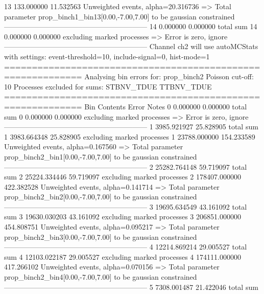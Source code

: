 13         133.000000      11.532563       Unweighted events, alpha=20.316736
  => Total parameter prop_binch1_bin13[0.00,-7.00,7.00] to be gaussian constrained
------------------------------------------------------------
14         0.000000        0.000000        total sum                     
14         0.000000        0.000000        excluding marked processes    
  => Error is zero, ignore      
------------------------------------------------------------
Channel ch2 will use autoMCStats with settings: event-threshold=10, include-signal=0, hist-mode=1
============================================================
Analysing bin errors for: prop_binch2
Poisson cut-off: 10
Processes excluded for sums: STBNV_TDUE TTBNV_TDUE
============================================================
Bin        Contents        Error           Notes                         
0          0.000000        0.000000        total sum                     
0          0.000000        0.000000        excluding marked processes    
  => Error is zero, ignore      
------------------------------------------------------------
1          3985.921927     25.828905       total sum                     
1          3983.664348     25.828905       excluding marked processes    
1          23788.000000    154.233589      Unweighted events, alpha=0.167560
  => Total parameter prop_binch2_bin1[0.00,-7.00,7.00] to be gaussian constrained
------------------------------------------------------------
2          25282.764148    59.719097       total sum                     
2          25224.334446    59.719097       excluding marked processes    
2          178407.000000   422.382528      Unweighted events, alpha=0.141714
  => Total parameter prop_binch2_bin2[0.00,-7.00,7.00] to be gaussian constrained
------------------------------------------------------------
3          19695.634549    43.161092       total sum                     
3          19630.030203    43.161092       excluding marked processes    
3          206851.000000   454.808751      Unweighted events, alpha=0.095217
  => Total parameter prop_binch2_bin3[0.00,-7.00,7.00] to be gaussian constrained
------------------------------------------------------------
4          12214.869214    29.005527       total sum                     
4          12103.022187    29.005527       excluding marked processes    
4          174111.000000   417.266102      Unweighted events, alpha=0.070156
  => Total parameter prop_binch2_bin4[0.00,-7.00,7.00] to be gaussian constrained
------------------------------------------------------------
5          7308.001487     21.422046       total sum                     
